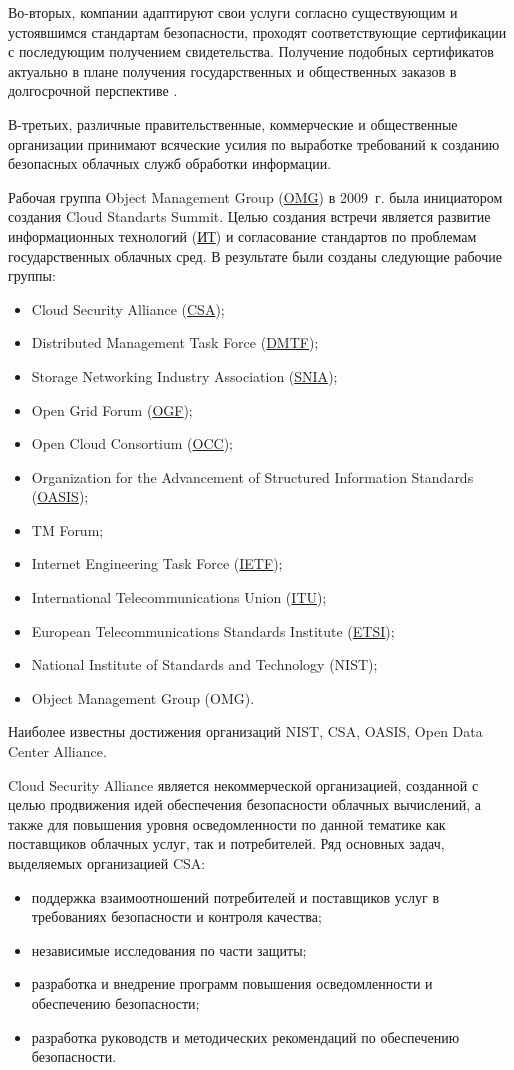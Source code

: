 Во-вторых, компании адаптируют свои услуги согласно существующим и устоявшимся стандартам безопасности, проходят соответствующие сертификации с последующим получением свидетельства.
Получение подобных сертификатов актуально в плане получения государственных и общественных заказов в долгосрочной перспективе \cite{itmo}.

В-третьих, различные правительственные, коммерческие и общественные организации принимают всяческие усилия по выработке требований к созданию безопасных облачных служб обработки информации.

Рабочая группа Object Management Group (\hyperlink{omg}{OMG}) в 2009~г. была инициатором создания Cloud Standarts Summit.
Целью создания встречи является развитие информационных технологий (\hyperlink{it}{ИТ}) и согласование стандартов по проблемам государственных облачных сред.
В результате были созданы следующие рабочие группы:
\begin{itemize}
  \item Cloud Security Alliance (\hyperlink{csa}{CSA});
  \item Distributed Management Task Force (\hyperlink{dmtf}{DMTF});
  \item Storage Networking Industry Association (\hyperlink{snia}{SNIA});
  \item Open Grid Forum (\hyperlink{ogf}{OGF});
  \item Open Cloud Consortium (\hyperlink{occ}{OCC});
  \item Organization for the Advancement of Structured Information Standards (\hyperlink{oasis}{OASIS});
  \item TM Forum;
  \item Internet Engineering Task Force (\hyperlink{ietf}{IETF});
  \item International Telecommunications Union (\hyperlink{itu}{ITU});
  \item European Telecommunications Standards Institute (\hyperlink{etsi}{ETSI});
  \item National Institute of Standards and Technology (NIST);
  \item Object Management Group (OMG).
\end{itemize}

Наиболее известны достижения организаций NIST, CSA, OASIS, Open Data Center Alliance.

Cloud Security Alliance является некоммерческой организацией, созданной с целью продвижения идей обеспечения безопасности облачных вычислений, а также для повышения уровня осведомленности по данной тематике как поставщиков облачных услуг, так и потребителей.
Ряд основных задач, выделяемых организацией CSA:
\begin{itemize}
  \item поддержка взаимоотношений потребителей и поставщиков услуг в требованиях безопасности и контроля качества;
  \item независимые исследования по части защиты;
  \item разработка и внедрение программ повышения осведомленности и обеспечению безопасности;
  \item разработка руководств и методических рекомендаций по обеспечению безопасности.
\end{itemize}

